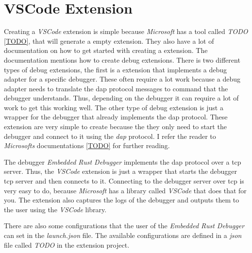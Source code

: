 \section{VSCode Extension} %
Creating a \emph{VSCode} extension is simple because \emph{Microsoft} has a tool called \emph{TODO} \ref{TODO}, that will generate a empty extension.
They also have a lot of documentation on how to get started with creating a extension.
The documentation mentions how to create debug extensions.
There is two different types of debug extensions, the first is a extension that implements a debug adapter for a specific debugger.
These often require a lot work because a debug adapter needs to translate the \gls{dap} protocol messages to command that the debugger understands.
Thus, depending on the debugger it can require a lot of work to get this working well.
The other type of debug extension is just a wrapper for the debugger that already implements the \gls{dap} protocol.
These extension are very simple to create because the they only need to start the debugger and connect to it using the \emph{dap} protocol.
I refer the reader to \emph{Microsofts} documentations \ref{TODO} for further reading.

The debugger \emph{Embedded Rust Debugger} implements the \gls{dap} protocol over a \gls{tcp} server.
Thus, the \emph{VSCode} extension is just a wrapper that starts the debugger \gls{tcp} server and then connects to it.
Connecting to the debugger server over \gls{tcp} is very easy to do, because \emph{Microsoft} has a library called \emph{VSCode} that does that for you.
The extension also captures the logs of the debugger and outputs them to the user using the \emph{VSCode} library.

There are also some configurations that the user of the \emph{Embedded Rust Debugger} can set in the \emph{launch.json} file.
The available configurations are defined in a \emph{json} file called \emph{TODO} in the extension project.
